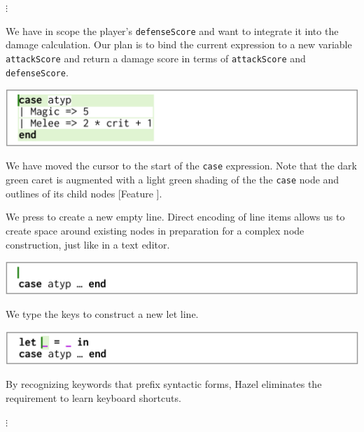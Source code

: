 \documentclass[format=sigplan,dvipsnames,backend=bibtex]{acmart}
\newcommand{\Hazel}{\textsf{Hazel}\xspace}
\newcommand{\key}[1]{\fbox{\texttt{#1}}}
\begin{document}
{\centering
	\vspace{-0.1cm}
  $\vdots$\par
  \vspace{0.1cm}
}
\noindent
We have in scope the player's \texttt{defenseScore}
	and want to integrate it into the damage calculation.
Our plan is to bind the current expression to a new variable \texttt{attackScore}
	and return a damage score in terms of \texttt{attackScore} and \texttt{defenseScore}.

{\centering
  \includegraphics[width=\linewidth]{fig/frame3.png}\par
}
\noindent
We have moved the cursor to the start of the \texttt{case} expression.
Note that the dark green caret is augmented with a light green shading of the
	the \texttt{case} node and outlines of its child nodes [Feature ].
	
We press \key{Enter} to create a new empty line.
Direct encoding of line items allows us to create space around existing nodes
	in preparation for a complex node construction, just like in a text editor.

{\centering
  \includegraphics[width=\linewidth]{fig/frame4.png}\par
}
\noindent
We type the keys \key{l} \key{e} \key{t} \key{Space} to construct a new let line.

{\centering
  \includegraphics[width=\linewidth]{fig/frame5.png}\par
}
\noindent
By recognizing keywords that prefix syntactic forms, \Hazel eliminates the requirement
	to learn keyboard shortcuts.

{\centering
	\vspace{-0.1cm}
  $\vdots$\par
  \vspace{0.1cm}
}
\noindent
\end{document}
